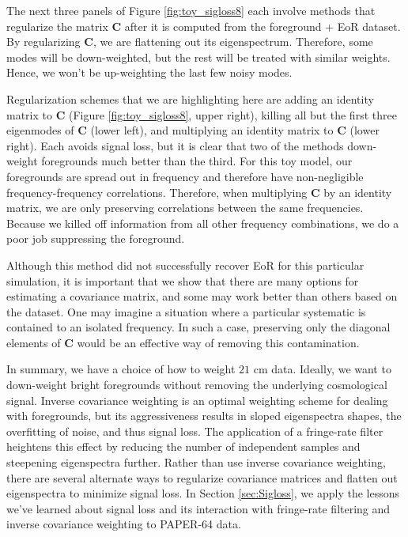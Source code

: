 \documentclass[preprint2,numberedappendix,tighten,twocolappendix]{aastex6}  %
\begin{document}
The next three panels of Figure \ref{fig:toy_sigloss8} each involve methods that regularize the matrix $\textbf{C}$ after it is computed from the foreground + EoR dataset. By regularizing $\textbf{C}$, we are flattening out its eigenspectrum. Therefore, some modes will be down-weighted, but the rest will be treated with similar weights. Hence, we won't be up-weighting the last few noisy modes. 

Regularization schemes that we are highlighting here are adding an identity matrix to $\textbf{C}$ (Figure \ref{fig:toy_sigloss8}, upper right), killing all but the first three eigenmodes of $\textbf{C}$ (lower left), and multiplying an identity matrix to $\textbf{C}$ (lower right). Each avoids signal loss, but it is clear that two of the methods down-weight foregrounds much better than the third. For this toy model, our foregrounds are spread out in frequency and therefore have non-negligible frequency-frequency correlations. Therefore, when multiplying $\textbf{C}$ by an identity matrix, we are only preserving correlations between the same frequencies. Because we killed off information from all other frequency combinations, we do a poor job suppressing the foreground.  

Although this method did not successfully recover EoR for this particular simulation, it is important that we show that there are many options for estimating a covariance matrix, and some may work better than others based on the dataset. One may imagine a situation where a particular systematic is contained to an isolated frequency. In such a case, preserving only the diagonal elements of $\textbf{C}$ would be an effective way of removing this contamination. 

In summary, we have a choice of how to weight $21$ cm data. Ideally, we want to down-weight bright foregrounds without removing the underlying cosmological signal. Inverse covariance weighting is an optimal weighting scheme for dealing with foregrounds, but its aggressiveness results in sloped eigenspectra shapes, the overfitting of noise, and thus signal loss. The application of a fringe-rate filter heightens this effect by reducing the number of independent samples and steepening eigenspectra further. Rather than use inverse covariance weighting, there are several alternate ways to regularize covariance matrices and flatten out eigenspectra to minimize signal loss. In Section \ref{sec:Sigloss}, we apply the lessons we've learned about signal loss and its interaction with fringe-rate filtering and inverse covariance weighting to PAPER-64 data.
\end{document}
